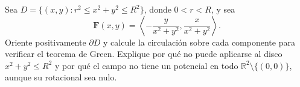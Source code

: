 Sea $D=\{(x,y):r^2\leq x^2+y^2\leq R^2\}$, donde $0<r<R$, y sea
\[
\mathbf{F}(x,y)=\left\langle-\frac{y}{x^2+y^2},\frac{x}{x^2+y^2}\right\rangle.
\]
Oriente positivamente $\partial D$ y calcule la circulación sobre cada componente para verificar el teorema de Green. Explique por qué no puede aplicarse al disco $x^2+y^2\leq R^2$ y por qué el campo no tiene un potencial en todo $\mathbb R^2\setminus\{(0,0)\}$, aunque su rotacional sea nulo.
